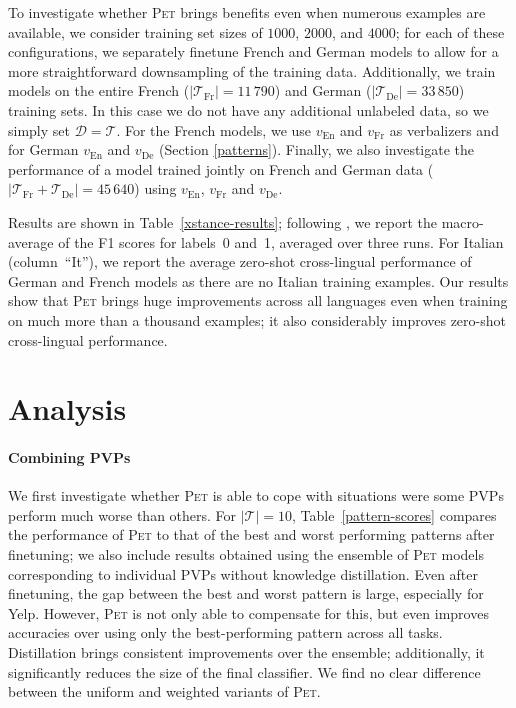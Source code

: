 To investigate whether \textsc{Pet} brings benefits even when numerous examples are available, we consider training set sizes of $1000$, $2000$, and $4000$; for each of these configurations, we separately finetune French and German models to allow for a more straightforward downsampling of the training data. Additionally, we train models on the entire French ($|\mathcal{T}_\text{Fr}| = 11\,790$)
and
German ($|\mathcal{T}_\text{De}| = 33\,850$)
training
sets. In this case we do not have any additional unlabeled data, so we simply set $\mathcal{D} = \mathcal{T}$. For the French models, we use
$v_\text{En}$ and $v_\text{Fr}$
as
verbalizers and for German
$v_\text{En}$ and $v_\text{De}$
(Section \ref{patterns}). Finally, we also investigate the performance of a model trained jointly on French and German data ($|\mathcal{T}_\text{Fr} + \mathcal{T}_\text{De}| = 45\,640$) using $v_\text{En}$,  $v_\text{Fr}$ and $v_\text{De}$.

Results are shown in Table~\ref{xstance-results};
following \citet{vamvas2020xstance}, we report the macro-average of the F1 scores for labels~0 and~1, averaged over three runs. For Italian (column~``It''), we report the average zero-shot cross-lingual performance of German and French models as there are no Italian training examples. Our results show that \textsc{Pet} brings huge improvements across all languages even when training on much more than a thousand examples; it also considerably improves zero-shot cross-lingual performance.

\section{Analysis}
\label{analysis}

\paragraph{Combining PVPs} We first investigate whether \textsc{Pet} is able to cope with situations were some PVPs perform much worse than others. For $|\mathcal{T}| = 10$, Table~\ref{pattern-scores}
compares the performance of \textsc{Pet} to that of the best and worst performing patterns after finetuning; we also include results obtained using the ensemble of \textsc{Pet} models corresponding to individual PVPs without knowledge distillation. Even after finetuning, the gap between the best and worst pattern is large, especially for Yelp. However, \textsc{Pet} is not only able to compensate for this, but even improves accuracies over using only the best-performing pattern across all tasks. Distillation brings consistent improvements over the ensemble; additionally, it significantly reduces the size of the final classifier. We find no clear difference between the uniform and weighted variants of \textsc{Pet}.

